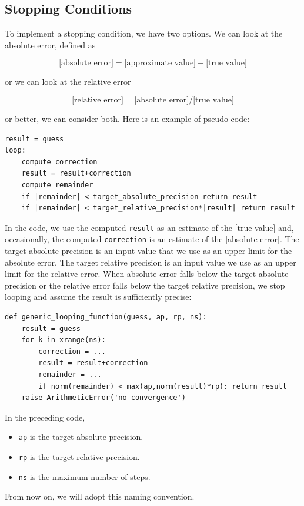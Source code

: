 \documentclass[justified,sixbynine]{tufte-book}
\def\ft{\small\tt}
\theoremstyle{plain}%
\theoremstyle{definition}
\theoremstyle{remark}
\begin{document}
\begin{fullwidth}
\goodbreak\subsection{Stopping Conditions}


To implement a stopping condition, we have two options. We can look at the absolute error, defined as

\begin{equation}
\textrm{[absolute error]}=\textrm{[approximate value]}-\textrm{[true value]}
\end{equation}

or we can look at the relative error

\begin{equation}
\textrm{[relative error]}=\textrm{[absolute error]}/\textrm{[true value]}
\end{equation}

or better, we can consider both. Here is an example of pseudo-code:

\begin{lstlisting}
result = guess
loop:
    compute correction
    result = result+correction
    compute remainder
    if |remainder| < target_absolute_precision return result
    if |remainder| < target_relative_precision*|result| return result
\end{lstlisting}

In the code, we use the computed {\ft result} as an estimate of the [true value] and, occasionally, the computed {\ft correction} is an estimate of the [absolute error]. The target absolute precision is an input value that we use as an upper limit for the absolute error. The target relative precision is an input value we use as an upper limit for the relative error. When absolute error falls below the target absolute precision or the relative error falls below the target relative precision, we stop looping and assume the result is sufficiently precise:

\begin{lstlisting}
def generic_looping_function(guess, ap, rp, ns):
    result = guess
    for k in xrange(ns):
        correction = ...
        result = result+correction
        remainder = ...
        if norm(remainder) < max(ap,norm(result)*rp): return result
    raise ArithmeticError('no convergence')
\end{lstlisting}

In the preceding code,
\begin{itemize}
\item {\ft ap} is the target absolute precision.
\item {\ft rp} is the target relative precision.
\item {\ft ns} is the maximum number of steps.
\end{itemize}
From now on, we will adopt this naming convention.



\end{fullwidth}
\end{document}
